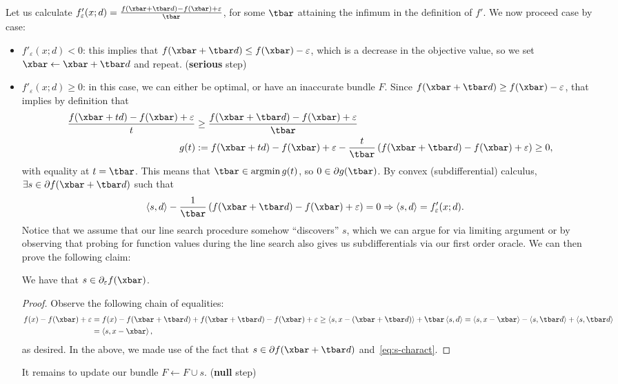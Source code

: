 Let us calculate $f'_{\varepsilon}(x; d) = \frac{f(\xbar + \tbar d) - f(\xbar)
+ \varepsilon}{\tbar}$, for some $\tbar$ attaining the infimum in the
definition of $f'$. We now proceed case by case:
\begin{itemize}
	\item $f'_{\varepsilon}(x; d) < 0$: this implies that \(
		f(\xbar + \tbar d) \leq f(\xbar) - \varepsilon \), which is a decrease
		in the objective value, so we set $\xbar \gets \xbar + \tbar d$ and
		repeat. (\textbf{serious} step)
	\item $f'_{\varepsilon}(x; d) \geq 0$: in this case, we can either be
		optimal, or have an inaccurate bundle $F$. Since $f(\xbar + \tbar d)
		\geq f(\xbar) - \varepsilon$, that implies by definition that
		\begin{align*}
			\frac{f(\xbar + t d) - f(\xbar) + \varepsilon}{t} &\geq
			\frac{f(\xbar + \tbar d) - f(\xbar) + \varepsilon}{\tbar} \\
			g(t) &:= f(\xbar + td) - f(\xbar) + \varepsilon - \frac{t}{\tbar}
			\left( f(\xbar + \tbar d) - f(\xbar) + \varepsilon \right) \geq 0,
		\end{align*}
		with equality at $t = \tbar$. This means that $\tbar \in \argmin g(t)$,
		so $0 \in \partial g(\tbar)$. By convex (subdifferential) calculus,
		$\exists s \in \partial f(\xbar + \tbar d)$ such that
		\begin{align}
			\ip{s, d} - \frac{1}{\tbar} \left(f(\xbar + \tbar d) - f(\xbar) +
			\varepsilon \right) &= 0 \Rightarrow
			\ip{s, d} = f'_{\varepsilon}(x; d).
			\label{eq:s-charact}
		\end{align}
		Notice that we assume that our line search procedure somehow
		``discovers'' $s$, which we can argue for via limiting argument or by
		observing that probing for function values during the line search also
		gives us subdifferentials via our first order oracle. We can then prove
		the following claim:
		\begin{claim}
			We have that $s \in \epsdiff f(\xbar)$.
		\end{claim}
		\begin{proof}
			Observe the following chain of equalities:
			\begin{align*}
				f(x) - f(\xbar) + \varepsilon &= f(x) - f(\xbar + \tbar d) +
				f(\xbar + \tbar d) - f(\xbar) + \varepsilon 
				\geq \ip{s, x - (\xbar + \tbar d)} + \tbar \ip{s, d}
				= \ip{s, x - \xbar} - \ip{s, \tbar d} + \ip{s, \tbar d} \\
				&= \ip{s, x - \xbar},
			\end{align*}
			as desired. In the above, we made use of the fact that $s \in
			\partial f(\xbar + \tbar d)$ and~\cref{eq:s-charact}.
		\end{proof}
		It remains to update our bundle $F \gets F \cup {s}$. (\textbf{null}
		step)
\end{itemize}

